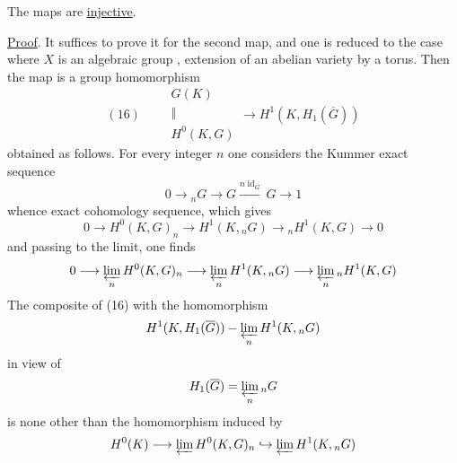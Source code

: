 The maps are \uline{injective}.

\uline{Proof}. It suffices to prove it for the second map, and one is reduced to the case where $X$ is  an algebraic group , extension of an abelian variety by a torus. Then the map is a group homomorphism
\[
(16)\qquad \begin{gathered}G(K)\\\Vert\\H^0(K,G)\end{gathered}\longrightarrow H^1(K,H_1(\overline G))
\]
obtained as follows. For every integer $n$ one considers the Kummer exact sequence
\[
0\longrightarrow {}_nG\longrightarrow G\xrightarrow{n\operatorname{id}_G}G\longrightarrow1
\]
whence exact cohomology sequence, which gives
\[
0\longrightarrow H^0(K,G)_n\longrightarrow H^1(K,{}_nG)\longrightarrow {}_nH^1(K,G)\longrightarrow0
\]
and passing to the limit, one finds
\[
0\longrightarrow\varprojlim_n H^0(K,G)_n\longrightarrow\varprojlim_n H^1(K,{}_nG)\longrightarrow\varprojlim_n {}_nH^1(K,G)
\]
The composite of (16) with the   homomorphism
\[
H^1(K,H_1(\overline G))-\varprojlim_n H^1(K,{}_nG)
\]
in view of
\[
H_1(\overline G)=\varprojlim_n {}_nG
\]
is none other than the homomorphism induced by
\[
H^0(K)\longrightarrow\varprojlim H^0(K,G)_n\hookrightarrow\varprojlim H^1(K,{}_nG)
\]
